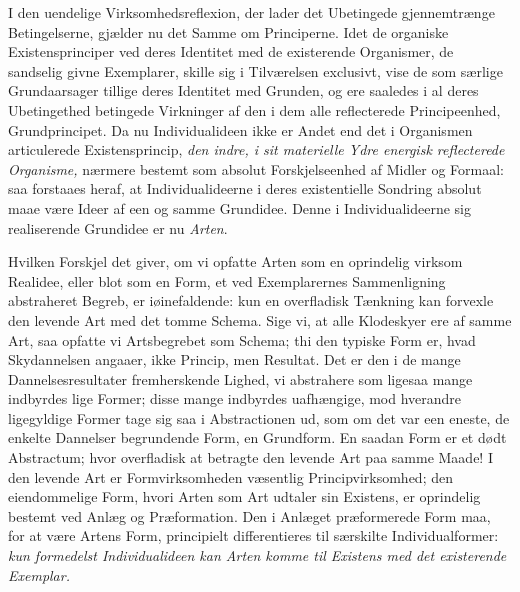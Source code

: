 \documentclass[12pt,a4paper]{book}
\begin{document}
I den uendelige Virksomhedsreflexion, der lader det Ubetingede gjennemtrænge
Betingelserne, gjælder nu det Samme om Principerne. Idet de organiske
Existensprinciper ved deres Identitet med de existerende Organismer, de
sandselig givne Exemplarer, skille sig i Tilværelsen exclusivt, vise de som
særlige Grundaarsager tillige deres Identitet med Grunden, og ere saaledes i al
deres Ubetingethed betingede Virkninger af den i dem alle reflecterede
Principeenhed, Grundprincipet. Da nu Individualideen ikke er Andet end det i
Organismen articulerede Existensprincip, \emph{den indre, i sit materielle Ydre
energisk reflecterede Organisme,} nærmere bestemt som absolut Forskjelseenhed af
Midler og Formaal: saa forstaaes heraf, at Individualideerne i deres
existentielle Sondring absolut maae være Ideer af een og samme Grundidee. Denne
i Individualideerne sig realiserende Grundidee er nu \emph{Arten}.

Hvilken Forskjel det giver, om vi opfatte Arten som en oprindelig virksom
Realidee, eller blot som en Form, et ved Exemplarernes Sammenligning abstraheret
Begreb, er iøinefaldende: kun en overfladisk Tænkning kan forvexle den levende
Art med det tomme Schema. Sige vi, at alle Klodeskyer ere af samme Art, saa
opfatte vi Artsbegrebet som Schema; thi den typiske Form er, hvad Skydannelsen
angaaer, ikke Princip, men Resultat. Det er den i de mange Dannelsesresultater
fremherskende Lighed, vi abstrahere som ligesaa mange indbyrdes lige Former;
disse mange indbyrdes uafhængige, mod hverandre ligegyldige Former tage sig saa
i Abstractionen ud, som om det var een eneste, de enkelte Dannelser begrundende
Form, en Grundform. En saadan Form er et dødt Abstractum; hvor overfladisk at
betragte den levende Art
\setcounter{footnote}{0}
paa samme Maade! I den levende Art er Formvirksomheden væsentlig
Principvirksomhed; den eiendommelige Form, hvori Arten som Art udtaler sin
Existens, er oprindelig bestemt ved Anlæg og Præformation. Den i Anlæget
præformerede Form maa, for at være Artens Form, principielt differentieres til
særskilte Individualformer: \emph{kun formedelst Individualideen kan Arten komme
til Existens med det existerende Exemplar.}
\end{document}
